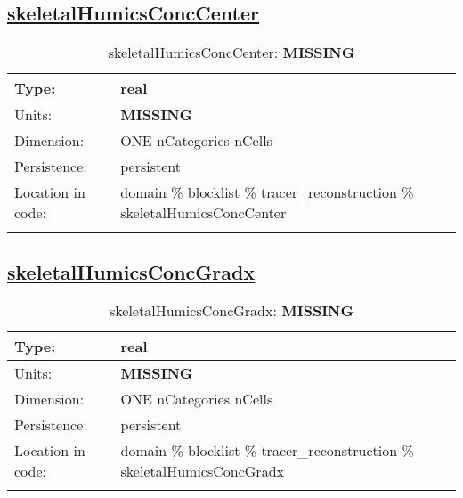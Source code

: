 \subsection[skeletalHumicsConcCenter]{\hyperref[sec:var_tab_tracer_reconstruction]{skeletalHumicsConcCenter}}
\label{subsec:var_sec_tracer_reconstruction_skeletalHumicsConcCenter}
\begin{center}
\begin{longtable}{| p{2.0in} | p{4.0in} |}
        \hline 
        Type: & real \\
        \hline 
        Units: & {\bf \color{red} MISSING} \\
        \hline 
        Dimension: & ONE nCategories nCells \\
        \hline 
        Persistence: & persistent \\
        \hline 
         Location in code: & domain \% blocklist \% tracer\_reconstruction \% skeletalHumicsConcCenter \\
         \hline 
    \caption{skeletalHumicsConcCenter: {\bf \color{red} MISSING}}
\end{longtable}
\end{center}
\subsection[skeletalHumicsConcGradx]{\hyperref[sec:var_tab_tracer_reconstruction]{skeletalHumicsConcGradx}}
\label{subsec:var_sec_tracer_reconstruction_skeletalHumicsConcGradx}
\begin{center}
\begin{longtable}{| p{2.0in} | p{4.0in} |}
        \hline 
        Type: & real \\
        \hline 
        Units: & {\bf \color{red} MISSING} \\
        \hline 
        Dimension: & ONE nCategories nCells \\
        \hline 
        Persistence: & persistent \\
        \hline 
         Location in code: & domain \% blocklist \% tracer\_reconstruction \% skeletalHumicsConcGradx \\
         \hline 
    \caption{skeletalHumicsConcGradx: {\bf \color{red} MISSING}}
\end{longtable}
\end{center}
